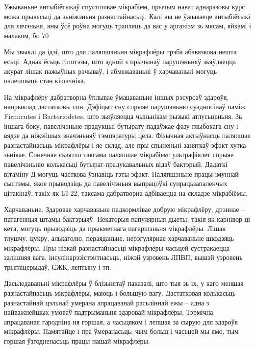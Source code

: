 Ужываньне антыбіётыкаў спустошвае мікрабіем, прычым нават аднаразовы курс можа прывесьці да зьніжэньня разнастайнасьці. Калі вы не ўжываеце антыбіётыкі для лячэньня, яны ўсё роўна могуць трапляць да вас у арганізм зь мясам, яйкамі і малаком, бо 70%

Мы звыклі да ідэі, што для паляпшэньня мікрафлёры трэба абавязкова нешта есьці. Аднак ёсьць гіпотэзы, што адной з прычынаў парушэньняў зьяўляецца акурат лішак пажыўных рэчываў, і абмежаваньні ў харчаваньні могуць палепшыць стан кішачніка.

На мікрафлёру дабратворна ўплывае ўмацаваньне іншых рэсурсаў здароўя, напрыклад дастатковы сон. Дэфіцыт сну спрыяе парушэньню суадносінаў паміж Firmicutes і Bacteriodetes, што зьяўляецца чыньнікам рызыкі атлусьценьня. Зь іншага боку, павелічэньне прадукцыі бутырату падаўжае фазу глыбокага сну і вядзе да ніжэйшых значэньняў тэмпэратуры цела. Фізычная актыўнасць паляпшае разнастайнасьць мікрафлёры і яе склад, але пры спыненьні заняткаў эфэкт хутка зьнікае. Сонечнае сьвятло таксама паляпшае мікрабіем: ультрафіялет спрыяе павелічэньню колькасьці бутырат-прадукавальных відаў бактэрый. Дадаткі вітаміну Д могуць часткова ўзнавіць гэты эфэкт. Паляпшэньне працы імуннай сыстэмы, якое прыводзіць да павелічэньня выпрацоўкі супрацьзапаленчых цітакінаў, такіх як ІЛ-22, таксама дабратворна адбіваецца на складзе мікрабіёмы.

Харчаваньне. Здаровае харчаваньне падкормлівае добрую мікрафлёру, дрэннае – патагенныя штамы бактэрыяў. Некаторыя папулярныя дыеты, такія як карнівор ці кета, могуць прыводзіць да прыкметнага пагаршэньня мікрафлёры. Лішак тлушчу, цукру, алькаголю, пераяданьне, нерэгулярнае харчаваньне шкодзяць мікрафлёры. Пры нізкай разнастайнасьці мікрафлёры часьцей сустракаецца залішняя вага, інсулінарэзістэнтнасьць, ніжэй узровень ЛПВП, вышэй узровень трыгліцерыдаў, СЖК, лептыну і тп.

Дасьледаваньні мікрафлёры ў блізьнятаў паказалі, што тыя зь іх, у каго меншая разнастайнасьць мікрафлёры, маюць і большую вагу. Дастатковая колькасьць разнастайнай цэльнай умерана апрацаванай расьліннай ежы – адна з найважнейшых умоваў падтрыманьня здаровай мікрафлёры. Тэрмічна апрацаваная гародніна ня горшая, а часьцяком і лепшая за сырую для здароўя мікрафлёры. Памятайце і пра ўмеранасьць: чым больш і часьцей мы ямо, тым горшая ўзгодненасьць працы нашай мікрафлёры.

